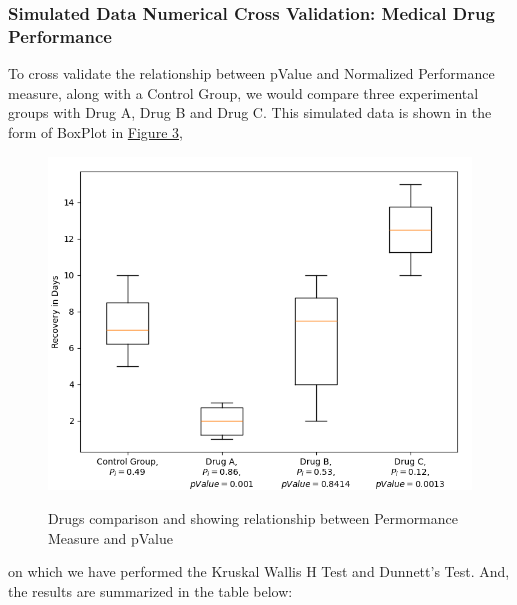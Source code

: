 \documentclass[a4paper,fleqn,review]{cas-sc}
\begin{document}
\subsubsection{Simulated Data Numerical Cross Validation: Medical Drug Performance}
To cross validate the relationship between pValue and Normalized Performance measure, along with a Control Group, we would compare three experimental groups with Drug A, Drug B and Drug C. This simulated data is shown in the form of BoxPlot in \hyperref[fig:box-plot]{Figure 3}, 
\begin{figure}
	\caption{Drugs comparison and showing relationship between Permormance Measure and pValue}
	\centering
	\includegraphics [scale=0.75]{simulation-data-kruskal-dunnett.png}
	\label{fig:box-plot}
\end{figure}
on which we have performed the Kruskal Wallis H Test and Dunnett's Test. And, the results are summarized in the table below:
	
\end{document}

